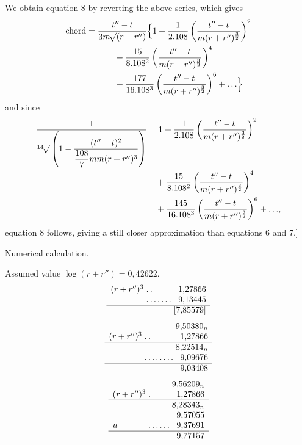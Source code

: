 We obtain equation 8 by reverting the above series, which gives
\[
\begin{aligned}
\text{chord}={}&\frac{t''-t}{3m\BareRoot{(r+r'')}}\Bigl\{1+\frac{1}{2\mathord{.}108}\left(\frac{t''-t}{m(r+r'')^{\frac{3}{2}}}\right)^2\\
&\qquad{}+\frac{15}{8\mathord{.}108^2}\left(\frac{t''-t}{m(r+r'')^{\frac{3}{2}}}\right)^4\\
&\qquad{}+\frac{177}{16\mathord{.}108^3}\left(\frac{t''-t}{m(r+r'')^{\frac{3}{2}}}\right)^6+\mathord{.}\,\mathord{.}\,\mathord{.}\Bigr\}
\end{aligned}
\]
and since
\[
\begin{aligned}
\frac{1}{\BareRoot[14]{\left(1-\dfrac{(t''-t)^2}{\dfrac{108}{7}mm(r+r'')^3}\right)}}
&=1+\frac{1}{2\mathord{.}108}\left(\frac{t''-t}{m(r+r'')^{\frac{3}{2}}}\right)^2\\
&\quad{}+\frac{15}{8\mathord{.}108^2}\left(\frac{t''-t}{m(r+r'')^{\frac{3}{2}}}\right)^4\\
&\quad{}+\frac{145}{16\mathord{.}108^3}\left(\frac{t''-t}{m(r+r'')^{\frac{3}{2}}}\right)^6+\mathord{.}\,\mathord{.}\,\mathord{.},
\end{aligned}
\]
equation 8 follows, giving a still closer approximation than equations 6 and 7.]
\begin{center}Numerical calculation.\end{center}
Assumed value \(\log(r+r'')=0{,}42622\).
\[
\begin{array}{l@{\;}l@{\;}r}
(r+r'')^3&\mathord{.}\,\mathord{.}&1{,}27866\\
&\mathord{.}\,\mathord{.}\,\mathord{.}\,\mathord{.}\,\mathord{.}\,\mathord{.}\,\mathord{.}&9{,}13445\\\hline
&&[7{,}85579]
\end{array}
\]
\[
\begin{array}{l@{\;}l@{\;}r}
&&9{,}50380_n\\
(r+r'')^3&\mathord{.}\,\mathord{.}&1{,}27866\\\hline
&&8{,}22514_n\\
&\mathord{.}\,\mathord{.}\,\mathord{.}\,\mathord{.}\,\mathord{.}\,\mathord{.}\,\mathord{.}\,\mathord{.}&9{,}09676\\\hline
&&9{,}03408
\end{array}
\]
\[
\begin{array}{l@{\;}l@{\;}r}
&&9{,}56209_n\\
(r+r'')^3&\mathord{.}&1{,}27866\\\hline
&&8{,}28343_n\\
&&9{,}57055\\
u&\mathord{.}\,\mathord{.}\,\mathord{.}\,\mathord{.}\,\mathord{.}\,\mathord{.}&9{,}37691\\\hline
&&9{,}77157
\end{array}
\]
